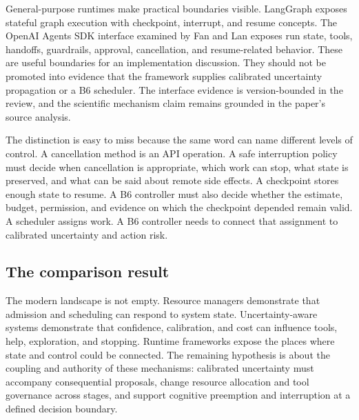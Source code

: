 General-purpose runtimes make practical boundaries visible. LangGraph exposes stateful graph execution with checkpoint, interrupt, and resume concepts. The OpenAI Agents SDK interface examined by Fan and Lan exposes run state, tools, handoffs, guardrails, approval, cancellation, and resume-related behavior. These are useful boundaries for an implementation discussion. They should not be promoted into evidence that the framework supplies calibrated uncertainty propagation or a B6 scheduler. The interface evidence is version-bounded in the review, and the scientific mechanism claim remains grounded in the paper's source analysis.\autocite{langgraph2026repo,openaiagents2026repo}

The distinction is easy to miss because the same word can name different levels of control. A cancellation method is an API operation. A safe interruption policy must decide when cancellation is appropriate, which work can stop, what state is preserved, and what can be said about remote side effects. A checkpoint stores enough state to resume. A B6 controller must also decide whether the estimate, budget, permission, and evidence on which the checkpoint depended remain valid. A scheduler assigns work. A B6 controller needs to connect that assignment to calibrated uncertainty and action risk.

\subsection{The comparison result}

The modern landscape is not empty. Resource managers demonstrate that admission and scheduling can respond to system state. Uncertainty-aware systems demonstrate that confidence, calibration, and cost can influence tools, help, exploration, and stopping. Runtime frameworks expose the places where state and control could be connected. The remaining hypothesis is about the coupling and authority of these mechanisms: calibrated uncertainty must accompany consequential proposals, change resource allocation and tool governance across stages, and support cognitive preemption and interruption at a defined decision boundary.


